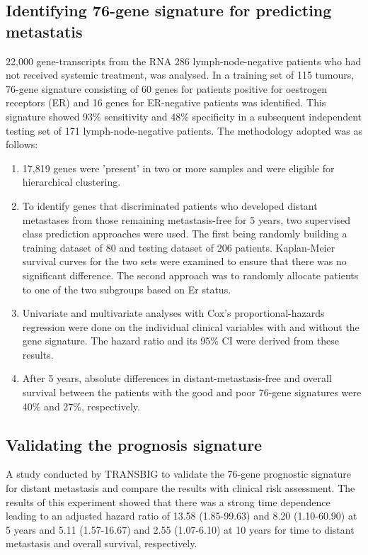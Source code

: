 \documentclass[13pt]{article}
\begin{document}
\subsection{Identifying 76-gene signature for predicting metastatis} 
22,000 gene-transcripts from the RNA 286 lymph-node-negative patients who had not received systemic treatment, was analysed. In a training set of 115 tumours, 76-gene signature consisting of 60 genes for patients positive for oestrogen receptors (ER) and 16 genes for ER-negative patients was identified. This signature showed 93\% sensitivity and 48\% specificity in a subsequent independent testing set of 171 lymph-node-negative patients. The methodology adopted was as follows: 
\begin{enumerate}
    \item 17,819 genes were 'present' in two or more samples and were eligible for hierarchical clustering. 
    \item To identify genes that discriminated patients who developed distant metastases from those remaining metastasis-free for 5 years, two supervised class prediction approaches were used. The first being randomly building a training dataset of 80 and testing dataset of 206 patients. Kaplan-Meier survival curves for the two sets were examined to ensure that there was no significant difference. The second approach was to randomly allocate patients to one of the two subgroups based on Er status. 
    \item Univariate and multivariate analyses with Cox’s proportional-hazards regression were done on the individual clinical variables with and without the gene signature. The hazard ratio and its 95\% CI were derived from these results.
    \item After 5 years, absolute differences in distant-metastasis-free and overall survival between the patients with the good and poor 76-gene signatures were 40\% and 27\%, respectively.\cite{wang2005gene}
\end{enumerate}

\subsection{Validating the prognosis signature} 
A study conducted by TRANSBIG to validate the 76-gene prognostic signature for distant metastasis and compare the results with clinical risk assessment. The results of this experiment showed that there was a strong time dependence leading to an adjusted hazard ratio of 13.58 (1.85-99.63) and 8.20 (1.10-60.90) at 5 years and 5.11 (1.57-16.67) and 2.55 (1.07-6.10) at 10 years for time to distant metastasis and overall survival, respectively.\cite{desmedt2007strong}
\end{document}
